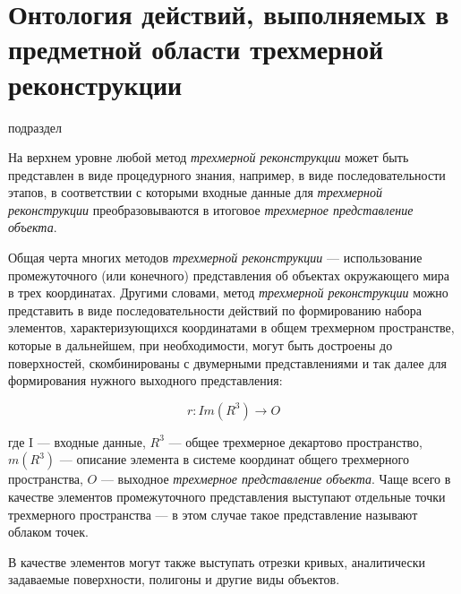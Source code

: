 \section{Онтология действий, выполняемых в предметной области трехмерной реконструкции}
\label{sec_3d_models_actions}
\begin{SCn}
\begin{scnrelfromlist}{подраздел}
\end{scnrelfromlist}
\end{SCn}
На верхнем уровне любой метод \textit{трехмерной реконструкции} может быть представлен в виде процедурного знания, например, в виде последовательности этапов, в соответствии с которыми входные данные для \textit{трехмерной реконструкции} преобразовываются в итоговое \textit{трехмерное представление объекта}.

Общая черта многих методов \textit{трехмерной реконструкции} --- использование промежуточного (или конечного) представления об объектах окружающего мира в трех координатах. Другими словами, метод \textit{трехмерной реконструкции} можно представить в виде последовательности действий по формированию набора элементов, характеризующихся координатами в общем трехмерном пространстве, которые в дальнейшем, при необходимости, могут быть достроены до поверхностей, скомбинированы с двумерными представлениями и так далее для формирования нужного выходного представления:

\begin{equation}
    r:I{m(R^3)}\rightarrow O
\end{equation}

где I --- входные данные, $R^3$ --- общее трехмерное декартово пространство, $m(R^3)$ --- описание элемента в системе координат общего трехмерного пространства, $O$ --- выходное \textit{трехмерное представление объекта}. Чаще всего в качестве элементов промежуточного представления выступают отдельные точки трехмерного пространства --- в этом случае такое представление называют облаком точек.

В качестве элементов могут также выступать отрезки кривых, аналитически задаваемые поверхности, полигоны и другие виды объектов.

